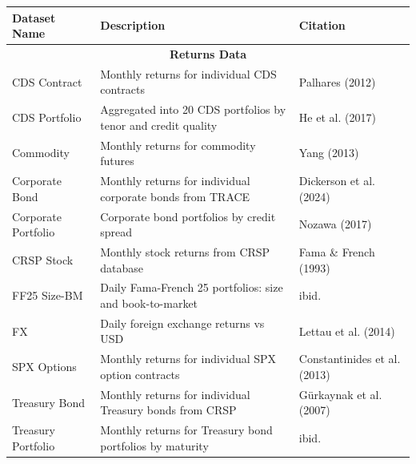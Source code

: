 \documentclass[ignorenonframetext, 9pt]{beamer}
\begin{document}
\begin{frame}[plain]
  \tiny
  \begin{table}
  \centering
  \begin{tabular}{p{2.5cm}p{5cm}p{2.5cm}}
  \toprule
  Dataset Name & Description & Citation \\
  \midrule
  \multicolumn{3}{c}{\textbf{Returns Data}} \\
  \midrule
  CDS Contract & Monthly returns for individual CDS contracts & Palhares (2012) \\
  CDS Portfolio & Aggregated into 20 CDS portfolios by tenor and credit quality & He et al. (2017) \\
  Commodity & Monthly returns for commodity futures & Yang (2013) \\
  Corporate Bond & Monthly returns for individual corporate bonds from TRACE & Dickerson et al. (2024) \\
  Corporate Portfolio & Corporate bond portfolios by credit spread & Nozawa (2017) \\
  CRSP Stock & Monthly stock returns from CRSP database & Fama \& French (1993) \\
  FF25 Size-BM & Daily Fama-French 25 portfolios: size and book-to-market & ibid. \\
  FX & Daily foreign exchange returns vs USD & Lettau et al. (2014) \\
  SPX Options & Monthly returns for individual SPX option contracts & Constantinides et al. (2013) \\
  Treasury Bond & Monthly returns for individual Treasury bonds from CRSP & Gürkaynak et al. (2007) \\
  Treasury Portfolio & Monthly returns for Treasury bond portfolios by maturity & ibid. \\
  \bottomrule
  \end{tabular}
  \end{table}
\end{frame}
\end{document}
